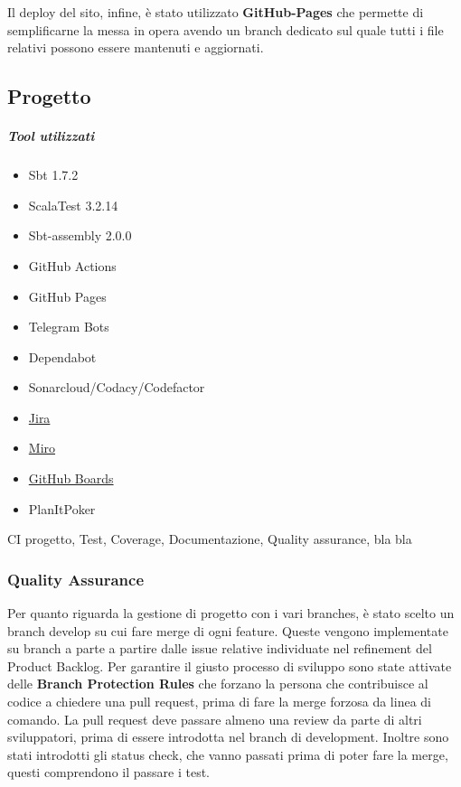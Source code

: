         Il deploy del sito, infine, è stato utilizzato \textbf{GitHub-Pages} che permette di semplificarne la messa in opera avendo un branch dedicato sul quale tutti i file relativi possono essere mantenuti e aggiornati.
        

    \subsection{Progetto}
        \subparagraph{Tool utilizzati}
        \begin{itemize}
            \item Sbt 1.7.2
            \item ScalaTest 3.2.14
            \item Sbt-assembly 2.0.0
            \item GitHub Actions
            \item GitHub Pages
            \item Telegram Bots
            \item Dependabot
            \item Sonarcloud/Codacy/Codefactor
            \item \href{https://riccardo-omiccioli.atlassian.net/jira/software/projects/IQ/boards/1/roadmap}{Jira}
            \item \href{https://miro.com/app/board/uXjVPN93uLs=/?share_link_id=56431555728}{Miro}
            \item \href{https://github.com/orgs/ISIQuiz/projects/3}{GitHub Boards}
            \item PlanItPoker \cite{planitpoker}
        \end{itemize}
    CI progetto, Test, Coverage, Documentazione, Quality assurance, bla bla

        \subsubsection{Quality Assurance}
        Per quanto riguarda la gestione di progetto con i vari branches, è stato scelto un branch develop su cui fare merge di ogni feature. Queste vengono implementate su branch a parte a partire dalle issue relative individuate nel refinement del Product Backlog. 
        Per garantire il giusto processo di sviluppo sono state attivate delle \textbf{Branch Protection Rules} che forzano la persona che contribuisce al codice a chiedere una pull request, prima di fare la merge forzosa da linea di comando. La pull request deve passare almeno una review da parte di altri sviluppatori, prima di essere introdotta nel branch di development. Inoltre sono stati introdotti gli status check, che vanno passati prima di poter fare la merge, questi comprendono il passare i test. 
        
